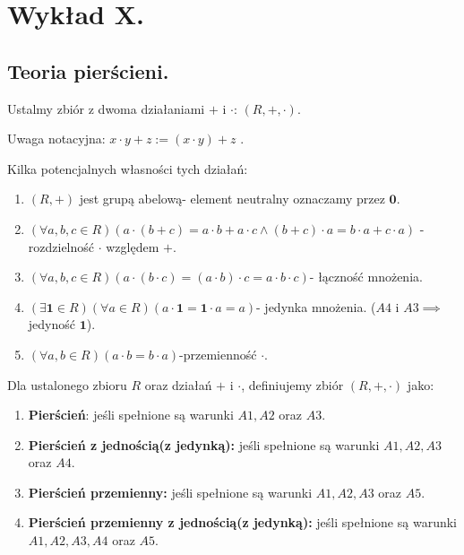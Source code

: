 \chapter{Wykład X.}

\section{Teoria pierścieni.}

Ustalmy zbiór z dwoma działaniami $+$ i $\cdot $: $\left( R, +,  \cdot  \right) $.

Uwaga notacyjna: $x\cdot y + z := \left( x\cdot y \right) + z$ .

Kilka potencjalnych własności tych działań:
\begin{enumerate}[label=A\arabic*.]
	\item $\left( R, + \right) $ jest grupą abelową- element neutralny oznaczamy przez $\mathbf{0}$.
	\item $\left(\forall a,b,c \in R \right)\left( a\cdot \left( b+c \right) = a\cdot b + a\cdot c \land (b+c)\cdot a = b\cdot a + c\cdot a\right) $ -rozdzielność $\cdot $ względem $+$.
	\item $\left(\forall a,b,c\in R \right) \left( a\cdot \left( b\cdot c \right) = \left( a\cdot b \right) \cdot c = a\cdot b\cdot c \right) $- łączność mnożenia.
	\item $\left(\exists \mathbf{1}\in R \right)\left(\forall a\in R \right)\left( a\cdot \mathbf{1} = \mathbf{1}\cdot a = a\right)$- jedynka mnożenia.  ($A4 \text{ i } A3 \implies $ jedyność $\mathbf{1}$).
	\item $\left(\forall a,b\in R \right)\left( a\cdot b = b\cdot a\right)  $-przemienność $\cdot $.
\end{enumerate}
\begin{definition}[Pierścień]
	Dla ustalonego zbioru $R$ oraz działań $+$ i $\cdot $, definiujemy zbiór $\left( R, +, \cdot  \right) $ jako:
	\begin{enumerate}[label=\arabic*.]
		\item \textbf{Pierścień}: jeśli spełnione są warunki $A1, A2$ oraz $A3$.
		\item  \textbf{Pierścień z jednością(z jedynką):} jeśli spełnione są warunki $A1, A2, A3$ oraz $A4$.
		\item \textbf{Pierścień przemienny:} jeśli spełnione są warunki $A1, A2, A3$ oraz $A5$.
		\item \textbf{Pierścień przemienny z jednością(z jedynką):} jeśli spełnione są warunki $A1, A2, A3, A4$ oraz $A5$.
	\end{enumerate}
\end{definition} 

